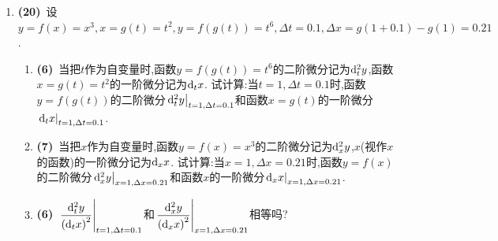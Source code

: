 \documentclass{ctexart}
\begin{document}
\begin{enumerate}[leftmargin=*,label=\textbf{\arabic*.},topsep=0pt,parsep=0pt,itemsep=0pt,partopsep=0pt]
    \item \textbf{(20)}\ 设$y=f(x)=x^3,x=g(t)=t^2,y=f(g(t))=t^6,\Delta t=0.1,\Delta x=g(1+0.1)-g(1)=0.21$.
        \begin{enumerate}[label=\textbf{(\arabic*)}]
            \item \textbf{(6)}\ 当把$t$作为自变量时,函数$y=f(g(t))=t^6$的二阶微分记为$\mathrm{d}_t^2y$,函数$x=g(t)=t^2$的一阶微分记为$\mathrm{d}_tx$.
                试计算:当$t=1,\Delta t=0.1$时,函数$y=f(g(t))$的二阶微分$\left.\mathrm{d}_t^2y\right|_{t=1,\Delta t=0.1}$和函数$x=g(t)$的一阶微分$\left.\mathrm{d}_tx\right|_{t=1,\Delta t=0.1}$.
            \item \textbf{(7)}\ 当把$x$作为自变量时,函数$y=f(x)=x^3$的二阶微分记为$\mathrm{d}_x^2y$,$x$(视作$x$的函数)的一阶微分记为$\mathrm{d}_xx$.
                试计算:当$x=1,\Delta x=0.21$时,函数$y=f(x)$的二阶微分$\left.\mathrm{d}_x^2y\right|_{x=1,\Delta x=0.21}$和函数$x$的一阶微分$\left.\mathrm{d}_xx\right|_{x=1,\Delta x=0.21}$.
            \item \textbf{(6)}\ $\left.\dfrac{\mathrm{d}_t^2y}{\left(\mathrm{d}_tx\right)^2}\right|_{t=1,\Delta t=0.1}$和$\left.\dfrac{\mathrm{d}_x^2y}{\left(\mathrm{d}_xx\right)^2}\right|_{x=1,\Delta x=0.21}$相等吗?
        \end{enumerate}
\end{enumerate}
\end{document}
